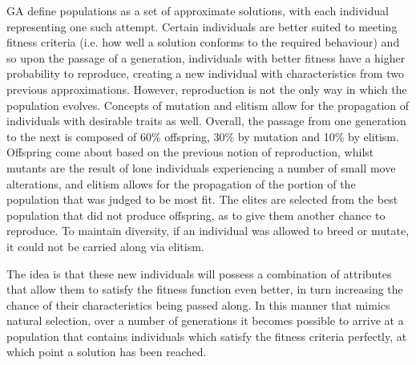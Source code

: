 \documentclass[UKenglish]{svproc}
\begin{document}
GA define populations as a set of approximate solutions, with each individual representing one such attempt. Certain individuals are better suited to meeting fitness criteria (i.e. how well a solution conforms to the required behaviour) and so upon the passage of a generation, individuals with better fitness have a higher probability to reproduce, creating a new individual with characteristics from two previous approximations. However, reproduction is not the only way in which the population evolves. Concepts of mutation and elitism allow for the propagation of individuals with desirable traits as well. Overall, the passage from one generation to the next is composed of 60\% offspring, 30\% by mutation and 10\% by elitism. Offspring come about based on the previous notion of reproduction, whilst mutants are the result of lone individuals experiencing a number of small move alterations, and elitism allows for the propagation of the portion of the population that was judged to be most fit. The elites are selected from the best population that did not produce offspring, as to give them another chance to reproduce. To maintain diversity, if an individual was allowed to breed or mutate, it could not be carried along via elitism.

The idea is that these new individuals will possess a combination of attributes that allow them to satisfy the fitness function even better, in turn increasing the chance of their characteristics being passed along. In this manner that mimics natural selection, over a number of generations it becomes possible to arrive at a population that contains individuals which satisfy the fitness criteria perfectly, at which point a solution has been reached.
\end{document}
